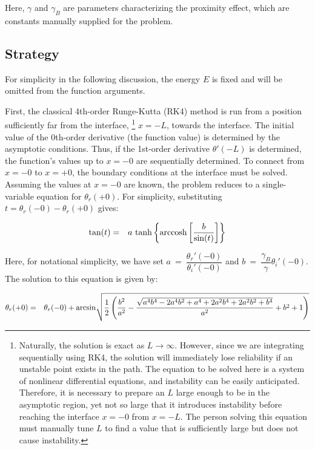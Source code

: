 \documentclass[uplatex,a4j,12pt,dvipdfmx]{jsarticle}
\begin{document}
Here, $\gamma$ and $\gamma_{B}$ are parameters characterizing the proximity effect,
which are constants manually supplied for the problem.


\subsection{Strategy}

For simplicity in the following discussion, the energy $E$ is fixed
and will be omitted from the function arguments.

First, the classical 4th-order Runge-Kutta (RK4) method is run
from a position sufficiently far from the interface,
\footnote{
	Naturally, the solution is exact as $L \to \infty$.
	However, since we are integrating sequentially using RK4,
	the solution will immediately lose reliability if an unstable point exists in the path.
	The equation to be solved here is a system of nonlinear differential equations,
	and instability can be easily anticipated.
	Therefore, it is necessary to prepare an $L$ large enough to be in the asymptotic region, yet not so large that it
	introduces instability before reaching the interface $x=-0$ from $x=-L$.
	The person solving this equation must manually tune $L$ to find a value
	that is sufficiently large but does not cause instability.
}
$x=-L$,
towards the interface.
The initial value of the 0th-order derivative (the function value) is determined by the asymptotic conditions.
Thus, if the 1st-order derivative $\theta'(-L)$ is determined,
the function's values up to $x=-0$ are sequentially determined.
To connect from $x=-0$ to $x=+0$, the boundary conditions at the interface must be solved.
Assuming the values at $x=-0$ are known,
the problem reduces to a single-variable equation for $\theta_{r}(+0)$.
For simplicity, substituting
$t=\theta_{r}(-0) - \theta_{r}(+0)$ gives:

\begin{eqnarray}
	{\rm tan}
	(t)
	&=&
	a
	\
	{\rm tanh}
	\left\{
	{\rm arccosh}
	\left[
		\dfrac{ b }{ {\rm sin} (t) }
		\right]
	\right\}
\end{eqnarray}

Here, for notational simplicity, we have set
$
	a
	\ = \
	\dfrac{ \theta_{r}'(-0) }{ \theta_{i}'(-0) }
$
and
$
	b
	\ = \
	\dfrac{ \gamma_{B} }{ \gamma }
	\theta_{i}'(-0)
$.
The solution to this equation is given by:

\begin{eqnarray}
	\theta_{r}(+0)
	&=&
	\theta_{r}(-0)
	+
	{\rm arcsin}
	\sqrt{
		\dfrac{ 1 }{ 2 }
		\left(
		\dfrac{ b^{2} }{ a^{2} }
		-
		\dfrac{ \sqrt{ a^{4} b^{4} - 2 a^{4} b^{2} + a^{4} + 2 a^{2} b^{4} + 2 a^{2} b^{2} + b^{4} } }{ a^{2} }
		+
		b^{2} + 1
		\right)
	}
	\nonumber \\
\end{eqnarray}
\end{document}
